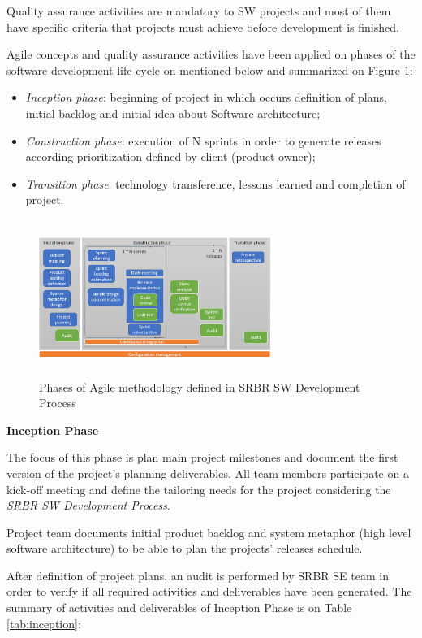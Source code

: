 Quality assurance activities are mandatory to SW projects and most of them have specific criteria that projects must achieve before development is finished.

Agile concepts and quality assurance activities have been applied on phases of the software development life cycle on mentioned below and summarized on Figure \ref{fig:agile}:

\begin{itemize}
\item \textit{Inception phase}: beginning of project in which occurs definition of plans, initial backlog and initial idea about Software architecture;
\item \textit{Construction phase}: execution of N sprints in order to generate releases according prioritization defined by client (product owner);
\item \textit{Transition phase}: technology transference, lessons learned and completion of project.
\end{itemize}

\begin{figure}[!h]
\includegraphics[height=2in, width=3in]{SRBRAgile}
\caption{Phases of Agile methodology defined in SRBR SW Development Process}
\label{fig:agile}
\end{figure}

\textbf{Inception Phase}

The focus of this phase is plan main project milestones and document the first version of the project's planning deliverables. All team members participate on a kick-off meeting and define the tailoring needs for the project considering the \textit{SRBR SW Development Process}. 

Project team documents initial product backlog and system metaphor (high level software architecture) to be able to plan the projects' releases schedule. 

After definition of project plans, an audit is performed by SRBR SE team in order to verify if all required activities and deliverables have been generated. The summary of activities and deliverables of Inception Phase is on Table \ref{tab:inception}:


